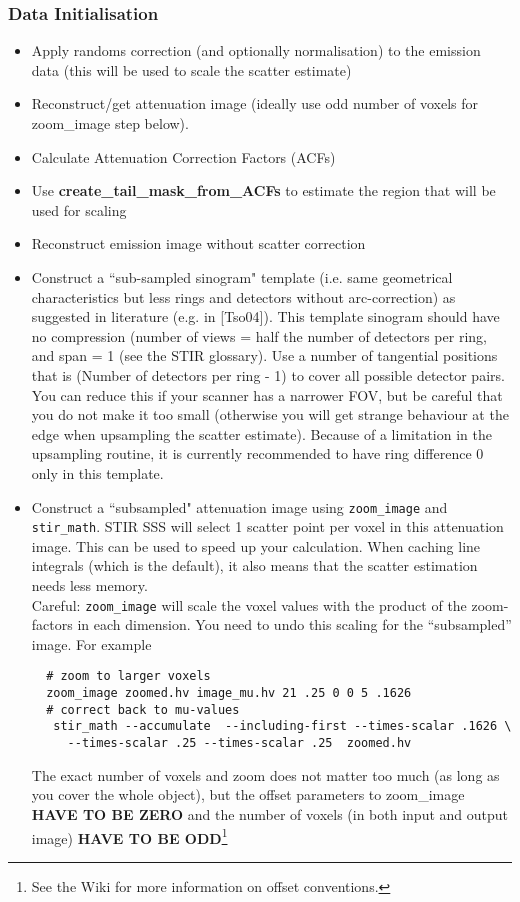 \documentclass{article}
\begin{document}
{\subsubsection{Data Initialisation \label{sec:scatter_data_initialisation}}
\begin{itemize}
\item Apply randoms correction (and optionally normalisation) to the emission data (this will be used to scale the scatter estimate)
\item Reconstruct/get attenuation image (ideally use odd number of voxels for zoom\_image step below).
\item Calculate Attenuation Correction Factors (ACFs)
\item Use \textbf{create\_tail\_mask\_from\_ACFs} to estimate the region that will be used for scaling
\item Reconstruct emission image without scatter correction
\item Construct a ``sub-sampled sinogram" template (i.e. same geometrical characteristics but
less rings and detectors without arc-correction) as suggested in literature (e.g. in [Tso04]). This template
sinogram should have no compression (number of views = half the number of detectors per ring, and span = 1 (see the
STIR glossary). 
Use a number of tangential positions that is (Number of detectors per ring - 1) to cover all possible
detector pairs. You can reduce this if your scanner has a narrower FOV, but be careful that you do not 
make it too small (otherwise you will get strange behaviour at the edge when upsampling the scatter estimate).
Because of a limitation in the upsampling routine, it is currently recommended to have ring difference 0 only in this
template.
\item Construct a ``subsampled" attenuation image using \texttt{zoom\_image} and \texttt{stir\_math}. 
 STIR SSS will select 1 scatter point per voxel in this attenuation image. This can be used to speed up your
 calculation. When caching line integrals (which is the default), it also means that the scatter estimation
 needs less memory.\\
 Careful: \texttt{zoom\_image} will scale the voxel values with the product of the zoom-factors in each dimension. 
 You need to undo this scaling for the ``subsampled'' image.    
 For example
 \begin{verbatim}
  # zoom to larger voxels 
  zoom_image zoomed.hv image_mu.hv 21 .25 0 0 5 .1626
  # correct back to mu-values
   stir_math --accumulate  --including-first --times-scalar .1626 \
     --times-scalar .25 --times-scalar .25  zoomed.hv
 \end{verbatim}
  The exact number of voxels and zoom does not matter too much (as long as you cover the 
  whole object), but the offset parameters to zoom\_image
  \textbf{HAVE TO BE ZERO} and the number of voxels (in both input and output image)
  \textbf{HAVE TO BE ODD}\footnote{See the Wiki for more information on offset conventions.}
\end{itemize}

}
\end{document}

